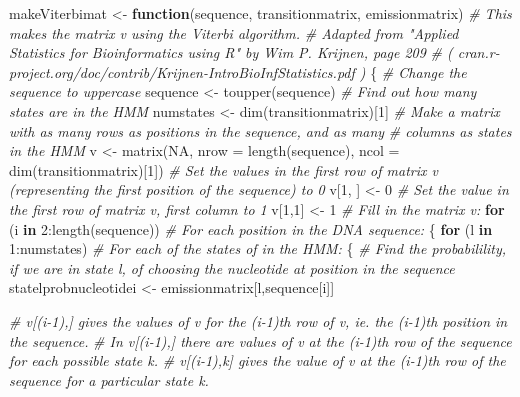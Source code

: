 \documentclass[
]{book}
\newenvironment{Shaded}{\begin{snugshade}}{\end{snugshade}}
\newcommand{\AttributeTok}[1]{\textcolor[rgb]{0.77,0.63,0.00}{#1}}
\newcommand{\CommentTok}[1]{\textcolor[rgb]{0.56,0.35,0.01}{\textit{#1}}}
\newcommand{\ConstantTok}[1]{\textcolor[rgb]{0.00,0.00,0.00}{#1}}
\newcommand{\ControlFlowTok}[1]{\textcolor[rgb]{0.13,0.29,0.53}{\textbf{#1}}}
\newcommand{\DecValTok}[1]{\textcolor[rgb]{0.00,0.00,0.81}{#1}}
\newcommand{\FunctionTok}[1]{\textcolor[rgb]{0.00,0.00,0.00}{#1}}
\newcommand{\NormalTok}[1]{#1}
\newcommand{\OtherTok}[1]{\textcolor[rgb]{0.56,0.35,0.01}{#1}}
\newcommand{\SpecialCharTok}[1]{\textcolor[rgb]{0.00,0.00,0.00}{#1}}
\begin{document}
\begin{Shaded}
\begin{Highlighting}[]
\NormalTok{makeViterbimat }\OtherTok{\textless{}{-}} \ControlFlowTok{function}\NormalTok{(sequence, transitionmatrix, emissionmatrix)}
  \CommentTok{\# This makes the matrix v using the Viterbi algorithm.}
  \CommentTok{\# Adapted from "Applied Statistics for Bioinformatics using R" by Wim P. Krijnen, page 209}
  \CommentTok{\# ( cran.r{-}project.org/doc/contrib/Krijnen{-}IntroBioInfStatistics.pdf )}
\NormalTok{  \{}
     \CommentTok{\# Change the sequence to uppercase}
\NormalTok{     sequence }\OtherTok{\textless{}{-}} \FunctionTok{toupper}\NormalTok{(sequence)}
     \CommentTok{\# Find out how many states are in the HMM}
\NormalTok{     numstates }\OtherTok{\textless{}{-}} \FunctionTok{dim}\NormalTok{(transitionmatrix)[}\DecValTok{1}\NormalTok{]}
     \CommentTok{\# Make a matrix with as many rows as positions in the sequence, and as many}
     \CommentTok{\# columns as states in the HMM}
\NormalTok{     v }\OtherTok{\textless{}{-}} \FunctionTok{matrix}\NormalTok{(}\ConstantTok{NA}\NormalTok{, }\AttributeTok{nrow =} \FunctionTok{length}\NormalTok{(sequence), }\AttributeTok{ncol =} \FunctionTok{dim}\NormalTok{(transitionmatrix)[}\DecValTok{1}\NormalTok{])}
     \CommentTok{\# Set the values in the first row of matrix v (representing the first position of the sequence) to 0}
\NormalTok{     v[}\DecValTok{1}\NormalTok{, ] }\OtherTok{\textless{}{-}} \DecValTok{0}
     \CommentTok{\# Set the value in the first row of matrix v, first column to 1}
\NormalTok{     v[}\DecValTok{1}\NormalTok{,}\DecValTok{1}\NormalTok{] }\OtherTok{\textless{}{-}} \DecValTok{1}
     \CommentTok{\# Fill in the matrix v:}
     \ControlFlowTok{for}\NormalTok{ (i }\ControlFlowTok{in} \DecValTok{2}\SpecialCharTok{:}\FunctionTok{length}\NormalTok{(sequence)) }\CommentTok{\# For each position in the DNA sequence:}
\NormalTok{     \{}
        \ControlFlowTok{for}\NormalTok{ (l }\ControlFlowTok{in} \DecValTok{1}\SpecialCharTok{:}\NormalTok{numstates) }\CommentTok{\# For each of the states of in the HMM:}
\NormalTok{        \{}
           \CommentTok{\# Find the probabilility, if we are in state l, of choosing the nucleotide at position in the sequence}
\NormalTok{           statelprobnucleotidei }\OtherTok{\textless{}{-}}\NormalTok{ emissionmatrix[l,sequence[i]]}

           \CommentTok{\# v[(i{-}1),] gives the values of v for the (i{-}1)th row of v, ie. the (i{-}1)th position in the sequence.}
           \CommentTok{\# In v[(i{-}1),] there are values of v at the (i{-}1)th row of the sequence for each possible state k.}
           \CommentTok{\# v[(i{-}1),k] gives the value of v at the (i{-}1)th row of the sequence for a particular state k.}


\end{Highlighting}
\end{Shaded}
\end{document}
